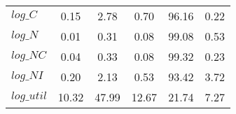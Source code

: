 \begin{center}
\begin{longtable}{lccccc}
$log\_C     $	 & 	        0.15	 & 	        2.78	 & 	        0.70	 & 	       96.16	 & 	        0.22 \\ 
$log\_N     $	 & 	        0.01	 & 	        0.31	 & 	        0.08	 & 	       99.08	 & 	        0.53 \\ 
$log\_NC    $	 & 	        0.04	 & 	        0.33	 & 	        0.08	 & 	       99.32	 & 	        0.23 \\ 
$log\_NI    $	 & 	        0.20	 & 	        2.13	 & 	        0.53	 & 	       93.42	 & 	        3.72 \\ 
$log\_util  $	 & 	       10.32	 & 	       47.99	 & 	       12.67	 & 	       21.74	 & 	        7.27 \\ 
\end{longtable}
 \end{center}
